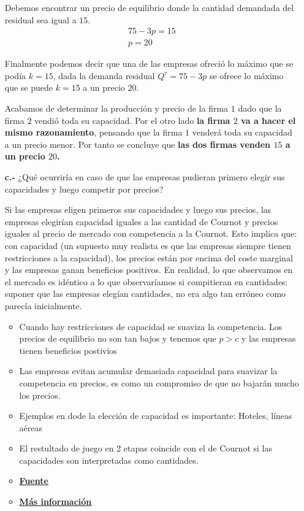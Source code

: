 \begin{itemize}
\begin{solution}
        Debemos encontrar un precio de equilibrio donde la cantidad demandada del residual sea igual a $15$.
        \begin{align*}
            75-3p= 15 \\
            p = 20
        \end{align*}

        Finalmente podemos decir que una de las empresas ofreció lo máximo que se podía $k = 15$, dada la demanda residual $Q^r = 75-3p$ se ofrece lo máximo que se puede $k =15$ a un precio $20$. 

        Acabamos de determinar la producción y precio de la firma $1$ dado que la firma $2$ vendió toda su capacidad. Por el otro lado \textbf{la firma $2$ va a hacer el mismo razonamiento}, pensando que la firma $1$ venderá toda su capacidad a un precio menor. Por tanto se concluye que \textbf{las dos firmas venden $15$ a un precio $20$. }
    \end{solution}
    \item [\textbf{c.-}] ¿Qué ocurriría en caso de que las empresas pudieran primero elegir sus capacidades y luego competir por precios?
    \begin{solution}
        Si las empresas eligen primeros sus capacidades y luego sus precios, las empresas elegirían capacidad iguales a las cantidad de Cournot y precios iguales al precio de mercado con competencia a la Cournot. Esto implica que: con capacidad (un supuesto muy realista es que las empresas siempre tienen restricciones a la capacidad), los precios están por encima del coste marginal y las empresas ganan beneficios positivos. En realidad, lo que observamos en el mercado es idéntico a lo que observaríamos si compitieran en cantidades: suponer que las empresas elegían cantidades, no era algo tan erróneo como parecía inicialmente. 
        \begin{itemize}
            \item Cuando hay restricciones de capacidad se suaviza la competencia. Los precios de equilibrio no son tan bajos y tenemos que $p> c$ y las empresas tienen beneficios postivios
            \item Las empresas evitan acumular demasiada capacidad para suavizar la competencia en precios, es como un compromiso de que no bajarán mucho los precios.
            \item Ejemplos en dode la elección de capacidad es importante: Hoteles, líneas aéreas
            \item El restultado de juego en 2 etapas coincide con el de Cournot si las capacidades son interpretadas como cantidades.
            \item \textbf{\href{https://www.eco.uc3m.es/~mmachado/Teaching/Industrial2007_2008/3.5.Competenciaenpreciosconrestriccionesdecapacidad_new.pdf}{\underline{Fuente}}} 
            \item \textbf{\href{https://www.eco.uc3m.es/~mmachado/Teaching/Industrial2007_2008/Industrial2006_07/3.4.Competenciaenpreciosconrestriccionesdecapacidad.pdf}{\underline{Más información}}}  
        \end{itemize}
    \end{solution}
\end{itemize}